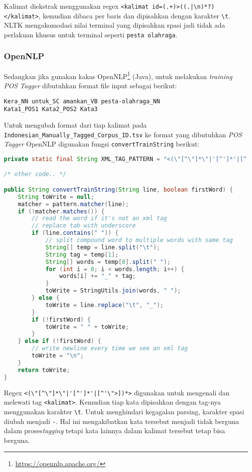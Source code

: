 \documentclass[paper=a4, fontsize=11pt]{scrartcl} %
\numberwithin{equation}{section} %
\numberwithin{figure}{section} %
\numberwithin{table}{section} %
\begin{document}
Kalimat diekstrak menggunakan regex \verb#<kalimat id=(.+)>((.|\n)*?)</kalimat>#, kemudian dibaca per baris dan dipisahkan dengan karakter \verb|\t|. NLTK mengakomodasi nilai terminal yang dipisahkan spasi jadi tidak ada perlakuan khusus untuk terminal seperti \verb|pesta olahraga|.

\subsubsection{OpenNLP}

Sedangkan jika gunakan kakas OpenNLP\footnote{\url{https://opennlp.apache.org/}} (Java), untuk melakukan \textit{training} \textit{POS Tagger} dibutuhkan format file input sebagai berikut:

\begin{lstlisting}
Kera_NN untuk_SC amankan_VB pesta-olahraga_NN
Kata1_POS1 Kata2_POS2 Kata3
\end{lstlisting}

Untuk mengubah format dari tiap kalimat pada \verb|Indonesian_Manually_Tagged_Corpus_ID.tsv| ke format yang dibutuhkan \textit{POS Tagger} OpenNLP digunakan fungsi \verb|convertTrainString| berikut:

\begin{lstlisting}[language=Java]
private static final String XML_TAG_PATTERN = "<(\"[^\"]*\"|'[^']*'|[^'\">])*>";

/* other code.. */

public String convertTrainString(String line, boolean firstWord) {
	String toWrite = null;
	matcher = pattern.matcher(line);
	if (!matcher.matches()) {
		// read the word if it's not an xml tag
		// replace tab with underscore
		if (line.contains(" ")) {
			// split compound word to multiple words with same tag
			String[] temp = line.split("\t");
			String tag = temp[1];
			String[] words = temp[0].split(" ");
			for (int i = 0; i < words.length; i++) {
				words[i] += "_" + tag;
			}
			toWrite = StringUtils.join(words, " ");
		} else {
			toWrite = line.replace("\t", "_");
		}
		if (!firstWord) {
			toWrite = " " + toWrite;
		}
	} else if (!firstWord) {
		// write newline every time we see an xml tag
		toWrite = "\n";
	}
	return toWrite;
}
\end{lstlisting}

Regex \verb#<(\"[^\"]*\"|'[^']*'|[^'\">])*># digunakan untuk mengenali dan melewati tag \verb|<kalimat>|. Kemudian tiap kata dipisahkan dengan tag-nya menggunakan karakter \verb|\t|. Untuk menghindari kegagalan parsing, karakter spasi diubah menjadi \verb|-|. Hal ini mengakibatkan kata tersebut menjadi tidak berguna dalam proses\textit{tagging} tetapi kata lainnya dalam kalimat tersebut tetap bisa berguna.
\end{document}
